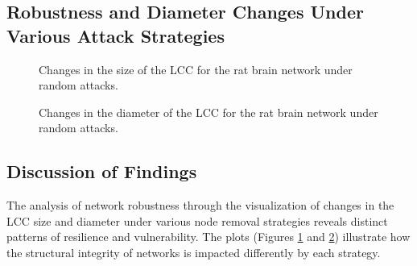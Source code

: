 \documentclass[
	report, %
	11pt, %
]{CSUniSchoolLabReport}
\newcounter{ct}
\begin{document}
\subsection{Robustness and Diameter Changes Under Various Attack Strategies}
\begin{figure}[H]
    \centering
	\captionsetup{justification=centering}
    \caption{Changes in the size of the LCC for the rat brain network under random attacks.}
    \label{fig:rat_random_lcc}
\end{figure}

\begin{figure}[H]
    \centering
	\captionsetup{justification=centering}
    \caption{Changes in the diameter of the LCC for the rat brain network under random attacks.}
    \label{fig:rat_random_diameter}
\end{figure}

\clearpage
\subsection{Discussion of Findings}

The analysis of network robustness through the visualization of changes in the LCC size and diameter under various node removal strategies reveals distinct patterns of resilience and vulnerability. The plots (Figures \ref{fig:rat_random_lcc} and \ref{fig:rat_random_diameter}) illustrate how the structural integrity of networks is impacted differently by each strategy.
\end{document}
